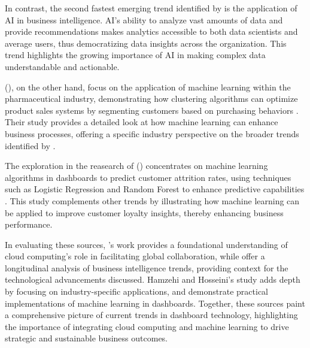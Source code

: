 In contrast, the second fastest emerging 
trend identified by \citeauthor{gurcanBusinessIntelligenceStrategies2023} 
is the application of AI in business intelligence. 
AI's ability to analyze vast amounts of data 
and provide recommendations makes analytics 
accessible to both data scientists and average 
users, thus democratizing data insights across 
the organization. This trend highlights the 
growing importance of AI in making complex data 
understandable and actionable.

\citeauthor{hamzehiBusinessIntelligenceUsing2022} (\citeyear{hamzehiBusinessIntelligenceUsing2022}), 
on the other hand, focus on the 
application of machine learning within the 
pharmaceutical industry, demonstrating how 
clustering algorithms can optimize product 
sales systems by segmenting customers based 
on purchasing behaviors \autocite[p. 33233]{hamzehiBusinessIntelligenceUsing2022}. 
Their study provides a detailed look at how 
machine learning can enhance business processes, 
offering a specific industry perspective on the 
broader trends identified by \citeauthor{gurcanBusinessIntelligenceStrategies2023}.

The exploration in the reasearch of \citeauthor{dalbahInteractiveDashboardPredicting2022} (\citeyear{dalbahInteractiveDashboardPredicting2022})
concentrates on 
machine learning algorithms in dashboards 
to predict customer attrition rates, using 
techniques such as Logistic Regression and 
Random Forest to enhance predictive capabilities 
\autocite[p.1]{dalbahInteractiveDashboardPredicting2022}. 
This study 
complements other trends by illustrating 
how machine learning can be applied to improve 
customer loyalty insights, thereby enhancing 
business performance.

In evaluating these sources, \citeauthor{bussaEnhancingBITools2023}'s work 
provides a foundational understanding of cloud 
computing's role in facilitating global 
collaboration, while \citeauthor{gurcanBusinessIntelligenceStrategies2023} 
offer a longitudinal analysis of business intelligence 
trends, providing context for the technological 
advancements discussed. Hamzehi and Hosseini's 
study adds depth by focusing on industry-specific 
applications, and \citeauthor{dalbahInteractiveDashboardPredicting2022} 
demonstrate 
practical implementations of machine learning in 
dashboards. Together, these sources paint a 
comprehensive picture of current trends in 
dashboard technology, highlighting the importance 
of integrating cloud computing and machine 
learning to drive strategic and sustainable 
business outcomes.

